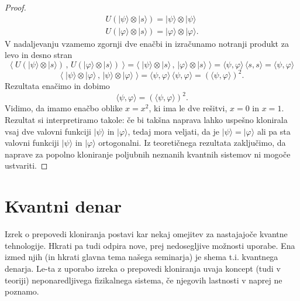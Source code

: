 \documentclass[12pt]{article}
\begin{document}
\begin{proof}
\begin{equation}
\begin{split}
U(| \psi \rangle \otimes | s \rangle) = | \psi \rangle \otimes | \psi \rangle
\\U(| \varphi \rangle \otimes | s \rangle) = | \varphi \rangle \otimes | \varphi \rangle.
\end{split}
\end{equation}
V nadaljevanju vzamemo zgornji dve enačbi in izračunamo notranji produkt za levo in desno stran
\begin{equation}
\langle \; U(| \psi \rangle \otimes | s \rangle) \, , \, U(| \varphi \rangle \otimes | s \rangle) \; \rangle = \langle \; | \psi \rangle \otimes | s \rangle \, , \, | \varphi \rangle \otimes | s \rangle \; \rangle = \langle \psi, \varphi \rangle \, \langle s, s \rangle = \langle \psi, \varphi \rangle
\end{equation}
\begin{equation}
\langle \; | \psi \rangle \otimes | \varphi \rangle \, , \, | \psi \rangle \otimes | \varphi \rangle \; \rangle = \langle \psi, \varphi \rangle \, \langle \psi, \varphi \rangle = \left( \langle \psi, \varphi \rangle \right)^2.
\end{equation}
Rezultata enačimo in dobimo
\begin{equation}
 \langle \psi, \varphi \rangle = \left( \langle \psi, \varphi \rangle \right)^2.
\end{equation}
Vidimo, da imamo enačbo oblike $x = x^2$, ki ima le dve rešitvi, $x = 0$ in $x = 1$. Rezultat si interpretiramo takole: če bi takšna naprava lahko uspešno klonirala vsaj dve valovni funkciji $| \psi \rangle$ in $| \varphi \rangle$, tedaj mora veljati, da je $ | \psi \rangle = | \varphi \rangle$ ali pa sta valovni funkciji $| \psi \rangle$ in $| \varphi \rangle$ ortogonalni. Iz teoretičnega rezultata zaključimo, da naprave za popolno kloniranje poljubnih neznanih kvantnih sistemov ni mogoče ustvariti.
\end{proof}
 
\section{Kvantni denar} 

Izrek o prepovedi kloniranja postavi kar nekaj omejitev za nastajajoče kvantne tehnologije. Hkrati pa tudi odpira nove, prej nedosegljive možnosti uporabe. Ena izmed njih (in hkrati glavna tema našega seminarja) je shema t.i. kvantnega denarja. Le-ta z uporabo izreka o prepovedi kloniranja uvaja koncept (tudi v teoriji) neponaredljivega fizikalnega sistema, če njegovih lastnosti v naprej ne poznamo.
\end{document}
